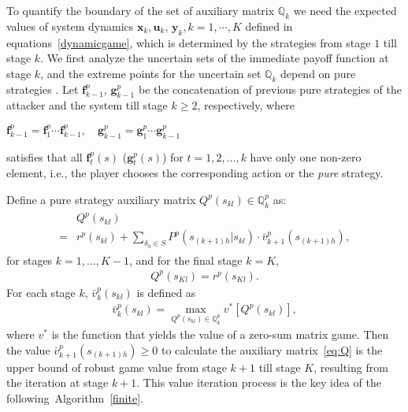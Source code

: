 To quantify the boundary of the set of auxiliary matrix $\mathbb{Q}_k$ %
we need the expected values of system dynamics $\mathbf{x}_{k}, \mathbf{u}_{k}$, $\mathbf{y}_{k}, k=1,\cdots,K$ defined in equations~\eqref{dynamicgame}, which is determined by the strategies from stage $1$ till stage $k$. 
We first analyze the uncertain sets of the immediate payoff function at stage $k$, and the extreme points for the uncertain set $\mathbb{Q}_k$ depend on pure strategies . Let $\mathbf{f}^p_{k-1}$, $\mathbf{g}^p_{k-1}$ be the concatenation of previous pure strategies of the attacker and the system till stage $k \geqslant 2$, respectively, where
\\\centerline{
$\mathbf{f}^{p}_{k-1}=\mathbf{f}^{p}_{1}\cdots\mathbf{f}^{p}_{k-1},\quad  \mathbf{g}^{p}_{k-1}=\mathbf{g}^{p}_{1}\cdots\mathbf{g}^{p}_{k-1}$
}
satisfies that all $\mathbf{f}^{p}_{t}(s)$ ($\mathbf{g}^{p}_{t}(s)$) for $t=1,2,\dots, k$ have only one non-zero element, i.e., the player chooses the corresponding action or the \emph{pure} strategy.

Define a pure strategy auxiliary matrix $Q^p(s_{kl}) \in \mathbb{Q}^p_{k}$ as:
\begin{align}
\begin{split}
&Q^{p}(s_{kl}) \\
=&r^{p}(s_{kl})+\sum_{\delta_h\in S} {P}^{p} ( s_{(k+1)h} |s_{kl})\cdot \bar{v}^p_{k+1}(s_{(k+1)h}),
\label{eq:Q}
\end{split}
\end{align}
for stages $k=1,\dots,K-1$, and for the final stage $k=K$,
\begin{align}
Q^{p}(s_{Kl})=r^{p}(s_{Kl}).
\label{Q_p}
\end{align}
For each stage $k$, $\bar{v}^p_{k}(s_{kl})$ is defined as
\begin{align}
\bar{v}_{k}^{p}(s_{kl})=\max_{Q^{p}(s_{kl})\in \mathbb{Q}^p_{k}}v^*[Q^{p}(s_{kl})],%
\label{pickv}
\end{align}
where $v^*$ is the function that yields the value of a zero-sum matrix game. Then the value $\bar{v}^p_{k+1}(s_{(k+1)h}) \geq 0$ to calculate the auxiliary matrix~\ref{eq:Q} is the upper bound of robust game value from stage $k+1$ till stage $K$, resulting from the iteration at stage $k+1$. This value iteration process is the key idea of the following~Algorithm~\ref{finite}. 

